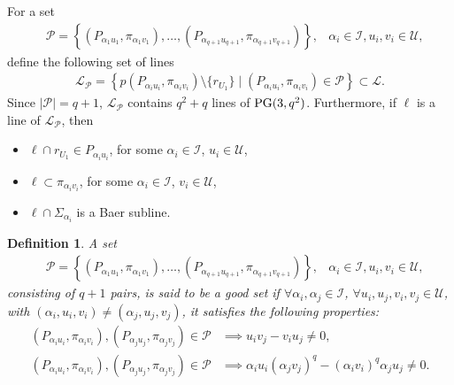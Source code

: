 \documentclass[11pt]{article}
\newtheorem{defin}[theorem]{Definition}
\theoremstyle{definition}
\numberwithin{equation}{section}
\def\cI{\mathcal I}
\def\cL{\mathcal L}
\def\cP{\mathcal P}
\def\cU{\mathcal U}
\def\PG{{\rm PG}}
\begin{document}
For a set
\begin{align*}
& \cP = \left\{\left(P_{\alpha_{1} u_1}, \pi_{\alpha_{1} v_1}\right), \dots, \left(P_{\alpha_{{q+1}} u_{q+1}}, \pi_{\alpha_{{q+1}} v_{q+1}}\right)\right\}, & \alpha_{i} \in \cI, u_i, v_i \in \cU, 
\end{align*}
define the following set of lines 
\begin{align*}
\cL_{\cP} = \left\{p\left(P_{\alpha_{i} u_i}, \pi_{\alpha_{i} v_i}\right) \setminus \{r_{U_1}\} \mid \left(P_{\alpha_{i} u_i}, \pi_{\alpha_{i} v_i}\right) \in \cP \right\} \subset \cL. 
\end{align*} 
Since $|\cP| = q+1$, $\cL_{\cP}$ contains $q^2+q$ lines of $\PG(3, q^2)$. Furthermore, if $\ell$ is a line of $\cL_{\cP}$, then 
\begin{itemize}
\item[{\em i)}] $\ell \cap r_{U_1} \in P_{\alpha_{i} u_i}$, for some $\alpha_{i} \in \cI$, $u_i \in \cU$, 
\item[{\em ii)}] $\ell \subset \pi_{\alpha_{i} v_i}$,  for some $\alpha_{i} \in \cI$, $v_i \in \cU$,  
\item[{\em iii)}] $\ell \cap \Sigma_{\alpha_{i}}$ is a Baer subline.
\end{itemize}

\begin{defin}\label{goodset}
    A set
\begin{align*}
& \cP = \left\{\left(P_{\alpha_{1} u_1}, \pi_{\alpha_{1} v_1}\right), \dots, \left(P_{\alpha_{{q+1}} u_{q+1}}, \pi_{\alpha_{{q+1}} v_{q+1}}\right)\right\}, & \alpha_{i} \in \cI, u_i, v_i \in \cU, 
\end{align*}
consisting of $q+1$ pairs, is said to be a {\em good set} if $\forall \alpha_{i}, \alpha_{j} \in \cI$, $\forall u_i, u_j, v_i, v_j \in \cU$, with $(\alpha_{i}, u_{i}, v_i) \ne (\alpha_{j}, u_j, v_j)$, it satisfies the following properties:
\begin{align}
\left(P_{\alpha_{i} u_i}, \pi_{\alpha_{i} v_i}\right), \left(P_{\alpha_{j} u_{j}}, \pi_{\alpha_{j} v_j}\right) \in \cP & \implies u_i v_j - v_i u_j \ne 0, \label{property1} \\
\left(P_{\alpha_{i} u_i}, \pi_{\alpha_{i} v_i}\right), \left(P_{\alpha_{j} u_{j}}, \pi_{\alpha_{j} v_{j}}\right) \in \cP & \implies \alpha_{i} u_i \left(\alpha_{j} v_{j}\right)^q - \left(\alpha_{i} v_i\right)^q \alpha_{j} u_{j} \ne 0. \label{property2}\end{align}
\end{defin}
\end{document}
